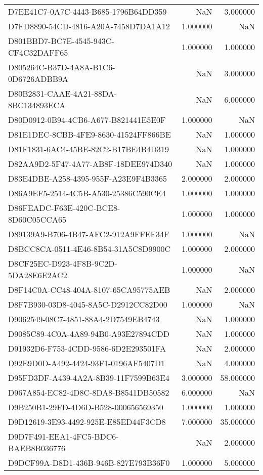 \begin{tabular}{lrr}
D7EE41C7-0A7C-4443-B685-1796B64DD359 & NaN & 3.000000 \\
D7FD8890-54CD-4816-A20A-7458D7DA1A12 & 1.000000 & NaN \\
D801BBD7-BC7E-4545-943C-CF4C32DAFF65 & 1.000000 & 1.000000 \\
D805264C-B37D-4A8A-B1C6-0D6726ADBB9A & NaN & 3.000000 \\
D80B2831-CAAE-4A21-88DA-8BC134893ECA & NaN & 6.000000 \\
D80D0912-0B94-4CB6-A677-B821441E5E0F & 1.000000 & NaN \\
D81E1DEC-8CBB-4FE9-8630-41524FF866BE & NaN & 1.000000 \\
D81F1831-6AC4-45BE-82C2-B17BE4B4D319 & NaN & 1.000000 \\
D82AA9D2-5F47-4A77-AB8F-18DEE974D340 & NaN & 1.000000 \\
D83E4DBE-A258-4395-955F-A23E9F4B3365 & 2.000000 & 2.000000 \\
D86A9EF5-2514-4C5B-A530-25386C590CE4 & 1.000000 & 1.000000 \\
D86FEADC-F63E-420C-BCE8-8D60C05CCA65 & 1.000000 & 1.000000 \\
D89139A9-B706-4B47-AFC2-912A9FFEF34F & 1.000000 & NaN \\
D8BCC8CA-0511-4E46-8B54-31A5C8D9900C & 1.000000 & 2.000000 \\
D8CF25EC-D923-4F8B-9C2D-5DA28E6E2AC2 & 1.000000 & NaN \\
D8F14C0A-CC48-404A-8107-65CA95775AEB & NaN & 2.000000 \\
D8F7B930-03D8-4045-8A5C-D2912CC82D00 & 1.000000 & NaN \\
D9062549-08C7-4851-88A4-2D7549EB4743 & NaN & 1.000000 \\
D9085C89-4C0A-4A89-94B0-A93E27894CDD & NaN & 1.000000 \\
D91932D6-F753-4CDD-9586-6D2E293501FA & NaN & 2.000000 \\
D92E9D0D-A492-4424-93F1-0196AF5407D1 & NaN & 4.000000 \\
D95FD3DF-A439-4A2A-8B39-11F7599B63E4 & 3.000000 & 58.000000 \\
D967A854-EC82-4D8C-8DA8-B8541DB50582 & 6.000000 & NaN \\
D9B250B1-29FD-4D6D-B528-000656569350 & 1.000000 & 1.000000 \\
D9D12619-3E93-4492-925E-E85ED44F3CD8 & 7.000000 & 35.000000 \\
D9D7F491-EEA1-4FC5-BDC6-BAEB8B036776 & NaN & 2.000000 \\
D9DCF99A-D8D1-436B-946B-827E793B36F0 & 1.000000 & 5.000000 \\

\end{tabular}
